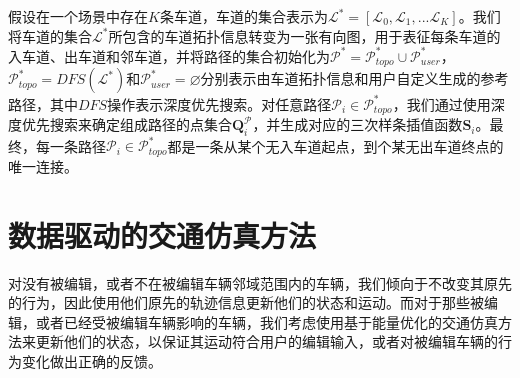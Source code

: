 假设在一个场景中存在$K$条车道，车道的集合表示为$\mathscr{L}^* = [\mathscr{L}_0, \mathscr{L}_1,...\mathscr{L}_K]$。我们将车道的集合$\mathscr{L}^*$所包含的车道拓扑信息转变为一张有向图，用于表征每条车道的入车道、出车道和邻车道，并将路径的集合初始化为$\mathscr{P}^* = {\mathscr{P}^*_{topo}}\cup{\mathscr{P}^*_{user}}$，$\mathscr{P}^*_{topo} = DFS\left(\mathscr{L}^*\right)$和$\mathscr{P}^*_{user} = \varnothing$分别表示由车道拓扑信息和用户自定义生成的参考路径，其中$DFS$操作表示深度优先搜索。对任意路径$\mathscr{P}_{i}\in\mathscr{P}^*_{topo}$，我们通过使用深度优先搜索来确定组成路径的点集合$\textbf{Q}^{\mathscr{P}}_{i}$，并生成对应的三次样条插值函数$\textbf{S}_{i}$。最终，每一条路径$\mathscr{P}_{i}\in\mathscr{P}^*_{topo}$都是一条从某个无入车道起点，到个某无出车道终点的唯一连接。




\section{数据驱动的交通仿真方法}
\label{section:traedits_simulate}

对没有被编辑，或者不在被编辑车辆邻域范围内的车辆，我们倾向于不改变其原先的行为，因此使用他们原先的轨迹信息更新他们的状态和运动。而对于那些被编辑，或者已经受被编辑车辆影响的车辆，我们考虑使用基于能量优化的交通仿真方法来更新他们的状态，以保证其运动符合用户的编辑输入，或者对被编辑车辆的行为变化做出正确的反馈。

